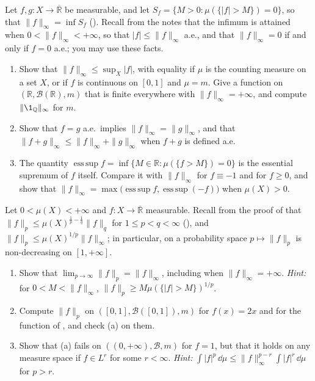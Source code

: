 
\begin{exercise}\label{ex:ld-essup}
\easy Let $f,g:X\to\overline{\mathbb R}$ be measurable, and let
$S_f=\{M>0:\mu(\{|f|>M\})=0\}$, so that $\|f\|_\infty=\inf S_f$ (). Recall from
the notes that the infimum is attained when $0<\|f\|_\infty<+\infty$, so that $|f|\le\|f\|_\infty$
a.e., and that $\|f\|_\infty=0$ if and only if $f=0$ a.e.; you may use these facts.
\begin{enumerate}[label=(\alph*)]
  \item Show that $\|f\|_\infty\le\sup_X|f|$, with equality if $\mu$ is the counting measure on a
    set $X$, or if $f$ is continuous on $[0,1]$ and $\mu=m$. Give a function on
    $(\mathbb R,\mathcal B(\mathbb R),m)$ that is finite everywhere with $\|f\|_\infty=+\infty$, and
    compute $\|\1_{\mathbb Q}\|_\infty$ for $m$.
  \item Show that $f=g$ a.e.\ implies $\|f\|_\infty=\|g\|_\infty$, and that
    $\|f+g\|_\infty\le\|f\|_\infty+\|g\|_\infty$ when $f+g$ is defined a.e.
  \item The quantity $\operatorname*{ess\,sup}f=\inf\{M\in\mathbb R:\mu(\{f>M\})=0\}$ is the
    essential supremum of $f$ itself. Compare it with $\|f\|_\infty$ for $f\equiv-1$ and for
    $f\ge0$, and show that $\|f\|_\infty=\max\big(\operatorname*{ess\,sup}f,\operatorname*{ess\,sup}(-f)\big)$
    when $\mu(X)>0$.
\end{enumerate}
\end{exercise}

\begin{exercise}\label{ex:ld-lp-limit}
\medium Let $0<\mu(X)<+\infty$ and $f:X\to\overline{\mathbb R}$ measurable. Recall from the proof of
 that $\|f\|_p\le\mu(X)^{\frac1p-\frac1q}\|f\|_q$ for $1\le p<q<\infty$
(), and $\|f\|_p\le\mu(X)^{1/p}\|f\|_\infty$; in particular, on a
probability space $p\mapsto\|f\|_p$ is non-decreasing on $[1,+\infty]$.
\begin{enumerate}[label=(\alph*)]
  \item Show that $\lim_{p\to\infty}\|f\|_p=\|f\|_\infty$, including when $\|f\|_\infty=+\infty$.
    \emph{Hint:} for $0<M<\|f\|_\infty$, $\|f\|_p\ge M\mu(\{|f|>M\})^{1/p}$.
  \item Compute $\|f\|_p$ on $([0,1],\mathcal B([0,1]),m)$ for $f(x)=2x$ and for the function of
    , and check (a) on them.
  \item Show that (a) fails on $((0,+\infty),\mathcal B,m)$ for $f=1$, but that it holds on any
    measure space if $f\in L^r$ for some $r<\infty$. \emph{Hint:}
    $\int|f|^p\,\dd\mu\le\|f\|_\infty^{p-r}\int|f|^r\,\dd\mu$ for $p>r$.
\end{enumerate}
\end{exercise}

